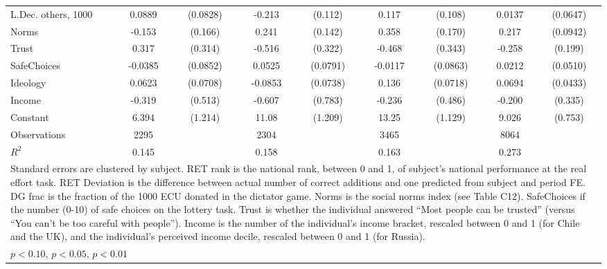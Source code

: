 {\begin{tabular}{l*{4}{cc}}
L.Dec. others, 1000&   0.0889         & (0.0828)&   -0.213\sym{*}  &  (0.112)&    0.117         &  (0.108)&   0.0137         & (0.0647)\\
Norms           &   -0.153         &  (0.166)&    0.241\sym{*}  &  (0.142)&    0.358\sym{**} &  (0.170)&    0.217\sym{**} & (0.0942)\\
Trust           &    0.317         &  (0.314)&   -0.516         &  (0.322)&   -0.468         &  (0.343)&   -0.258         &  (0.199)\\
SafeChoices     &  -0.0385         & (0.0852)&   0.0525         & (0.0791)&  -0.0117         & (0.0863)&   0.0212         & (0.0510)\\
Ideology        &   0.0623         & (0.0708)&  -0.0853         & (0.0738)&    0.136\sym{*}  & (0.0718)&   0.0694         & (0.0433)\\
Income          &   -0.319         &  (0.513)&   -0.607         &  (0.783)&   -0.236         &  (0.486)&   -0.200         &  (0.335)\\
Constant        &    6.394\sym{***}&  (1.214)&    11.08\sym{***}&  (1.209)&    13.25\sym{***}&  (1.129)&    9.026\sym{***}&  (0.753)\\
\hline
Observations    &     2295         &         &     2304         &         &     3465         &         &     8064         &         \\
\(R^{2}\)       &    0.145         &         &    0.158         &         &    0.163         &         &    0.273         &         \\
\hline\hline
\multicolumn{9}{p{15cm}}{\tiny Standard errors are clustered by subject. RET rank is the national rank, between 0 and 1, of subject’s national performance at the real effort task. RET Deviation is the difference between actual number of correct additions and one predicted from subject and period FE. DG frac is the fraction of the 1000 ECU donated in the dictator game. Norms is the social norms index (see Table C12). SafeChoices if the number (0-10) of safe choices on the lottery task. Trust is whether the individual answered “Most people can be trusted” (versus “You can’t be too careful with people”). Income is the number of the individual’s income bracket, rescaled between 0 and 1 (for Chile and the UK), and the individual’s perceived income decile, rescaled between 0 and 1 (for Russia).}\\
\multicolumn{9}{l}{\footnotesize \sym{*} \(p<0.10\), \sym{**} \(p<0.05\), \sym{***} \(p<0.01\)}\\
\end{tabular}
}
